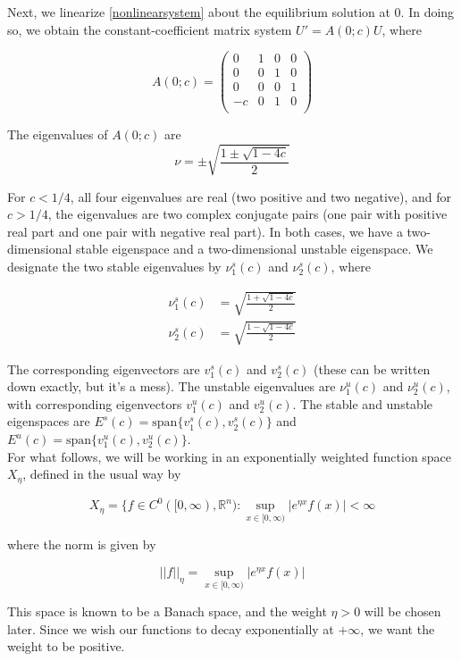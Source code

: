 \documentclass[12pt]{article}
\def\R{{\mathbb R}}
\begin{document}
Next, we linearize \eqref{nonlinearsystem} about the equilibrium solution at 0. In doing so, we obtain the constant-coefficient matrix system $U' = A(0; c) U$, where

\[
A(0; c) = 
\begin{pmatrix}
0 & 1 & 0 & 0 \\
0 & 0 & 1 & 0 \\
0 & 0 & 0 & 1 \\
-c & 0 & 1 & 0 \\ 
\end{pmatrix}
\]

The eigenvalues of $A(0; c)$ are
\[
\nu = \pm \sqrt{ \frac{1 \pm \sqrt{1 - 4c} }{2}}
\]

For $c < 1/4$, all four eigenvalues are real (two positive and two negative), and for $c > 1/4$, the eigenvalues are two complex conjugate pairs (one pair with positive real part and one pair with negative real part). In both cases, we have a two-dimensional stable eigenspace and a two-dimensional unstable eigenspace. We designate the two stable eigenvalues by $\nu_1^s(c)$ and $\nu_2^s(c)$, where

\begin{align*}
\nu_1^s(c) &= \sqrt{ \frac{1 + \sqrt{1 - 4c} }{2}}\\
\nu_2^s(c) &= \sqrt{ \frac{1 - \sqrt{1 - 4c} }{2}}
\end{align*}

The corresponding eigenvectors are $v_1^s(c)$ and $v_2^s(c)$ (these can be written down exactly, but it's a mess). The unstable eigenvalues are $\nu_1^u(c)$ and $\nu_2^u(c)$, with corresponding eigenvectors $v_1^u(c)$ and $v_2^u(c)$. The stable and unstable eigenspaces are $E^s(c) = \text{span}\{ v_1^s(c), v_2^s(c) \}$ and $E^u(c) = \text{span}\{ v_1^u(c), v_2^u(c) \}$.\\

For what follows, we will be working in an exponentially weighted function space $X_\eta$, defined in the usual way by 

\[
X_\eta = \{ f \in C^0([0, \infty), \R^n) : \sup_{x \in [0, \infty)} |e^{\eta x} f(x)| < \infty 
\]

where the norm is given by

\[
||f||_\eta = \sup_{x \in [0, \infty)} |e^{\eta x} f(x)|
\]

This space is known to be a Banach space, and the weight $\eta > 0$ will be chosen later. Since we wish our functions to decay exponentially at $+\infty$, we want the weight to be positive.\\
\end{document}
